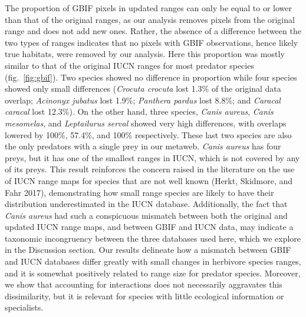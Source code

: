 \documentclass[10pt,oneside]{article}
\begin{document}
The proportion of GBIF pixels in updated ranges can only be equal to or
lower than that of the original ranges, as our analysis removes pixels
from the original range and does not add new ones. Rather, the absence
of a difference between the two types of ranges indicates that no pixels
with GBIF observations, hence likely true habitats, were removed by our
analysis. Here this proportion was mostly similar to that of the
original IUCN ranges for most predator species (fig.~\ref{fig:gbif}).
Two species showed no difference in proportion while four species showed
only small differences (\emph{Crocuta crocuta} lost 1.3\% of the
original data overlap; \emph{Acinonyx jubatus} lost 1.9\%;
\emph{Panthera pardus} lost 8.8\%; and \emph{Caracal caracal} lost
12.3\%). On the other hand, three species, \emph{Canis aureus},
\emph{Canis mesomelas}, and \emph{Leptailurus serval} showed very high
differences, with overlaps lowered by 100\%, 57.4\%, and 100\%
respectively. These last two species are also the only predators with a
single prey in our metaweb. \emph{Canis aureus} has four preys, but it
has one of the smallest ranges in IUCN, which is not covered by any of
its preys. This result reinforces the concern raised in the literature
on the use of IUCN range maps for species that are not well known
(Herkt, Skidmore, and Fahr 2017), demonstrating how small range species
are likely to have their distribution underestimated in the IUCN
database. Additionally, the fact that \emph{Canis aureus} had such a
conspicuous mismatch between both the original and updated IUCN range
maps, and between GBIF and IUCN data, may indicate a taxonomic
incongruency between the three databases used here, which we explore in
the Discussion section. Our results delineate how a mismatch between
GBIF and IUCN databases differ greatly with small changes in herbivore
species ranges, and it is somewhat positively related to range size for
predator species. Moreover, we show that accounting for interactions
does not necessarily aggravates this dissimilarity, but it is relevant
for species with little ecological information or specialists.
\end{document}
